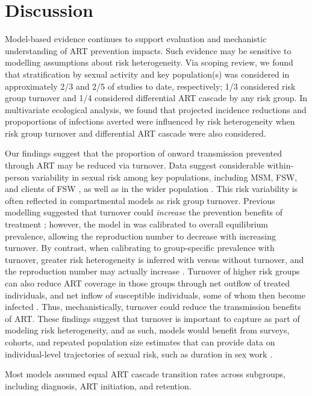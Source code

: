 \section{Discussion}
\label{s:disc}
Model-based evidence continues to support
evaluation and mechanistic understanding of ART prevention impacts.
Such evidence may be sensitive to modelling assumptions about risk heterogeneity.
Via scoping review, we found that stratification by sexual activity and key population(s)
was considered in approximately 2/3 and 2/5 of studies to date, respectively;
1/3 considered risk group turnover and 1/4 considered differential ART cascade by any risk group.
In multivariate ecological analysis, we found that
projected incidence reductions and propoportions of infections averted were influenced by
risk heterogeneity when risk group turnover and differential ART cascade were also considered.
\par
Our findings suggest that the proportion of onward transmission prevented through ART
may be reduced via turnover.
Data suggest considerable within-person variability in sexual risk among key populations,
including MSM, FSW, and clients of FSW \cite{Fazito2012,Romero-Severson2012,Roberts2020},
as well as in the wider population \cite{Houle2018}.
This risk variability is often reflected in compartmental models as risk group turnover.
Previous modelling suggested that
turnover could \emph{increase} the prevention benefits of treatment \cite{Henry2015};
however, the model in \cite{Henry2015} was calibrated to overall equilibrium prevalence,
allowing the reproduction number to decrease with increasing turnover.
By contrast, when calibrating to group-specific prevalence with turnover,
greater risk heterogeneity is inferred with versus without turnover,
and the reproduction number may actually increase \cite{Knight2020}.
Turnover of higher risk groups can also reduce ART coverage in those groups through
net outflow of treated individuals, and net inflow of susceptible individuals,
some of whom then become infected \cite{Knight2020}.
Thus, mechanistically, turnover could reduce the transmission benefits of ART.
These findings suggest that turnover is important to capture as part of modeling risk heterogeneity,
and as such, models would benefit from surveys, cohorts, and repeated population size estimates
that can provide data on individual-level trajectories of sexual risk,
such as duration in sex work \cite{Watts2010}.
\par
Most models assumed equal ART cascade transition rates across subgroups,
including diagnosis, ART initiation, and retention.
